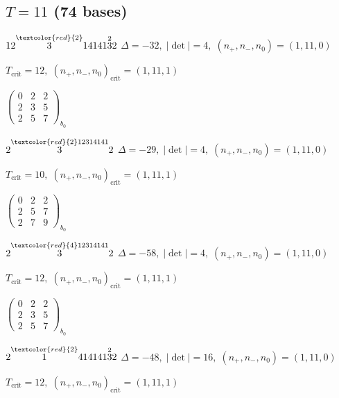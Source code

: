 \documentclass[10pt]{article}
\begin{document}
\subsection*{$T = 11$ \quad (74 bases)}
\smallskip

$12\overset{\textcolor{red}{2}}{3}14141\overset{2}{3}2$ \quad $\Delta=-32,\; |\det|=4,\; (n_+,n_-,n_0)=(1,11,0)$

\hspace{1em}$T_{\text{crit}}=12,\; (n_+,n_-,n_0)_{\text{crit}}=(1,11,1)$

\hspace{2em}$\left(\begin{smallmatrix}0 & 2 & 2 \\ 2 & 3 & 5 \\ 2 & 5 & 7\end{smallmatrix}\right)_{\!b_0}$

$2\overset{\textcolor{red}{2}12314141}{3}2$ \quad $\Delta=-29,\; |\det|=4,\; (n_+,n_-,n_0)=(1,11,0)$

\hspace{1em}$T_{\text{crit}}=10,\; (n_+,n_-,n_0)_{\text{crit}}=(1,11,1)$

\hspace{2em}$\left(\begin{smallmatrix}0 & 2 & 2 \\ 2 & 5 & 7 \\ 2 & 7 & 9\end{smallmatrix}\right)_{\!b_0}$

$2\overset{\textcolor{red}{4}12314141}{3}2$ \quad $\Delta=-58,\; |\det|=4,\; (n_+,n_-,n_0)=(1,11,0)$

\hspace{1em}$T_{\text{crit}}=12,\; (n_+,n_-,n_0)_{\text{crit}}=(1,11,1)$

\hspace{2em}$\left(\begin{smallmatrix}0 & 2 & 2 \\ 2 & 3 & 5 \\ 2 & 5 & 7\end{smallmatrix}\right)_{\!b_0}$

\smallskip

$2\overset{\textcolor{red}{2}}{1}414141\overset{2}{3}2$ \quad $\Delta=-48,\; |\det|=16,\; (n_+,n_-,n_0)=(1,11,0)$

\hspace{1em}$T_{\text{crit}}=12,\; (n_+,n_-,n_0)_{\text{crit}}=(1,11,1)$
\end{document}
